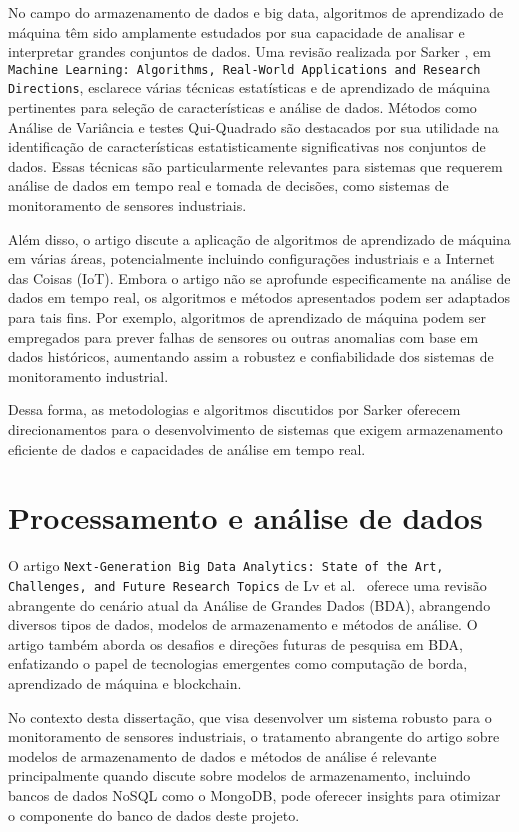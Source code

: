 No campo do armazenamento de dados e big data, algoritmos de aprendizado de máquina têm sido amplamente estudados por sua capacidade de analisar e interpretar grandes conjuntos de dados. Uma revisão realizada por Sarker \cite{sarker2021machine}, em \texttt{Machine Learning: Algorithms, Real-World Applications and Research Directions}, esclarece várias técnicas estatísticas e de aprendizado de máquina pertinentes para seleção de características e análise de dados. Métodos como Análise de Variância e testes Qui-Quadrado são destacados por sua utilidade na identificação de características estatisticamente significativas nos conjuntos de dados. Essas técnicas são particularmente relevantes para sistemas que requerem análise de dados em tempo real e tomada de decisões, como sistemas de monitoramento de sensores industriais.

Além disso, o artigo discute a aplicação de algoritmos de aprendizado de máquina em várias áreas, potencialmente incluindo configurações industriais e a Internet das Coisas (IoT). Embora o artigo não se aprofunde especificamente na análise de dados em tempo real, os algoritmos e métodos apresentados podem ser adaptados para tais fins. Por exemplo, algoritmos de aprendizado de máquina podem ser empregados para prever falhas de sensores ou outras anomalias com base em dados históricos, aumentando assim a robustez e confiabilidade dos sistemas de monitoramento industrial.

Dessa forma, as metodologias e algoritmos discutidos por Sarker \cite{sarker2021machine} oferecem direcionamentos para o desenvolvimento de sistemas que exigem armazenamento eficiente de dados e capacidades de análise em tempo real.


\section{Processamento e análise de dados}
O artigo \texttt{Next-Generation Big Data Analytics: State of the Art, Challenges, and Future Research Topics} de Lv et al.~\cite{Lv2017} oferece uma revisão abrangente do cenário atual da Análise de Grandes Dados (BDA), abrangendo diversos tipos de dados, modelos de armazenamento e métodos de análise. O artigo também aborda os desafios e direções futuras de pesquisa em BDA, enfatizando o papel de tecnologias emergentes como computação de borda, aprendizado de máquina e blockchain.

No contexto desta dissertação, que visa desenvolver um sistema robusto para o monitoramento de sensores industriais, o tratamento abrangente do artigo sobre modelos de armazenamento de dados e métodos de análise é relevante principalmente quando discute sobre modelos de armazenamento, incluindo bancos de dados NoSQL como o MongoDB, pode oferecer insights para otimizar o componente do banco de dados deste projeto.

